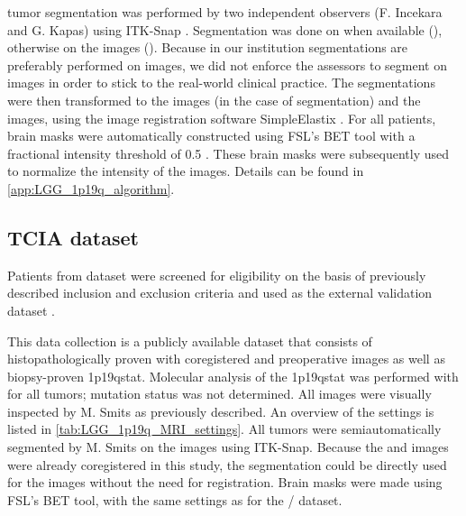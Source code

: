 \Gls{tumor} segmentation was performed by two independent observers (F. Incekara and G. Kapas) using ITK-Snap \autocite{yushkevich2006user}.
Segmentation was done on  when available (), otherwise on the  images ().
Because in our institution  segmentations are preferably performed on  images, we did not enforce the assessors to segment on  images in order to stick to the real-world clinical practice.
The segmentations were then transformed to the  images (in the case of  segmentation) and the  images, using the image registration software SimpleElastix \autocite{marstal2016simpleelastix}.
For all patients, brain masks were automatically constructed using FSL's BET tool with a fractional intensity threshold of \num{0.5} \autocite{smith2002fast}.
These brain masks were subsequently used to normalize the intensity of the  images.
Details can be found in \cref{app:LGG_1p19q_algorithm}.

\subsection{\acrlong{TCIA} dataset}

Patients from   dataset were screened for eligibility on the basis of previously described inclusion and exclusion criteria and used as the external validation dataset \autocite{akkus2017predicting, clark2013cancer, bradley2017radiology}.

This data collection is a publicly available dataset that consists of histopathologically proven  with coregistered  and  preoperative  images as well as biopsy-proven \acl{1p19qstat}.
Molecular analysis of the \acl{1p19qstat} was performed with  for all \glspl{tumor};  mutation status was not determined.
All  images were visually inspected by M. Smits as previously described.
An overview of the  settings is listed in \cref{tab:LGG_1p19q_MRI_settings}.
All \glspl{tumor} were semiautomatically segmented by M. Smits on the  images using ITK-Snap.
Because the  and  images were already coregistered in this study, the segmentation could be directly used for the  images without the need for registration.
Brain masks were made using FSL's BET tool, with the same settings as for the / dataset.

